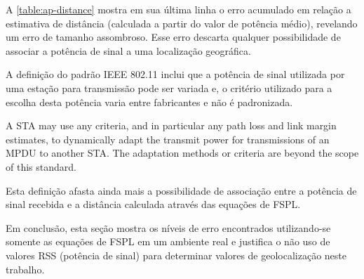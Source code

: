 \begin{table}[htb]
\end{table}

A \autoref{table:ap-distance} mostra em sua última linha o erro acumulado em
relação a estimativa de distância (calculada a partir do valor de potência
médio), revelando um erro de tamanho assombroso. Esse erro descarta qualquer
possibilidade de associar a potência de sinal a uma localização geográfica.

A definição do padrão IEEE 802.11 inclui que a potência de sinal utilizada por
uma estação para transmissão pode ser variada e, o critério utilizado para a
escolha desta potência varia entre fabricantes e não é padronizada.

\begin{citacao}[english]

	A STA may use any criteria, and in particular any path loss and link margin
	estimates, to dynamically adapt the transmit power for transmissions of an
	MPDU to another STA. The adaptation methods or criteria are beyond the scope
	of this standard. \

\end{citacao}

Esta definição afasta ainda mais a possibilidade de associação entre a potência
de sinal recebida e a distância calculada através das equações de FSPL.

Em conclusão, esta seção mostra os níveis de erro encontrados utilizando-se
somente as equações de FSPL em um ambiente real e justifica o não uso de valores
RSS (potência de sinal) para determinar valores de geolocalização neste
trabalho.
